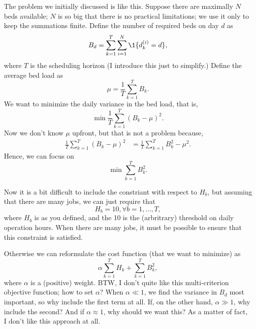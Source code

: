 \documentclass{article}
\begin{document}
The problem we initially discussed is like this. Suppose there are maximally $N$ beds available; $N$ is so big that there is no practical limitations; we use it only to keep the summations finite. Define the number of required beds on day $d$ as 
\begin{equation*}
  B_d = \sum_{k=1}^T \sum_{i=1}^N \1{d_k^{(i)}=d},
\end{equation*}
where $T$ is the scheduling horizon  (I introduce this just to simplify.)
Define the average bed load as
\begin{equation*}
  \mu = \frac1T\sum_{k=1}^T B_k.
\end{equation*}
We want to minimize the daily variance in the bed load, that is,
\begin{equation*}
  \min \frac 1T \sum_{k=1}^T (B_k - \mu)^2.
\end{equation*}
Now we don't know $\mu$ upfront, but that is not a problem because, 
\begin{equation*}
  \begin{split}
\frac 1 T\sum_{k=1}^T (B_k - \mu)^2 
&=  \frac 1 T \sum_{k=1}^T B_k^2 - \mu^2.
  \end{split}
\end{equation*}
Hence, we can focus on 
\begin{equation*}
\min  \sum_{k=1}^T B_k^2.
\end{equation*}


Now it is a bit difficult to include the constriant with respect to $H_b$, but assuming that there are many jobs, we can just require that 
\begin{equation*}
  H_b = 10, \forall b=1,\ldots, T,
\end{equation*}
where $H_b$ is as you defined, and the 10 is the (arbritrary) threshold on daily operation hours.  When there are many jobs, it must be possible to ensure that this constraint is satisfied. 

Otherwise we can reformulate the cost function (that we want to minimize) as 
\begin{equation*}
  \alpha \sum_{k=1}^T H_k + \sum_{k=1}^T B_k^2,
\end{equation*}
where $\alpha$ is a (positive) weight. BTW, I don't quite like this multi-criterion objective function; how to set $\alpha$? When $\alpha\ll 1$, we find the variance in $B_d$ most important, so why include the first term at all. If, on the other hand, $\alpha \gg 1$, why include the second? And if $\alpha \approx 1$, why should we want this? As a matter of fact, I don't like this approach at all. 
\end{document}
